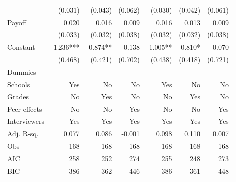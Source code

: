 \begin{table}[htbp]
\begin{adjustbox}{width=1\textwidth}
\begin{threeparttable}
\begin{tabular}{l*{6}{D{.}{.}{-1}}}
                    &             (0.031)   &             (0.043)   &             (0.062)   &             (0.030)   &             (0.042)   &             (0.061)   \\
Payoff              &               0.020   &               0.016   &               0.009   &               0.016   &               0.013   &               0.009   \\
                    &             (0.033)   &             (0.032)   &             (0.038)   &             (0.032)   &             (0.032)   &             (0.038)   \\
Constant            &              -1.236***&              -0.874** &               0.138   &              -1.005** &              -0.810*  &              -0.070   \\
                    &             (0.468)   &             (0.421)   &             (0.702)   &             (0.438)   &             (0.418)   &             (0.721)   \\ \midrule
Dummies &&&&&& \\
Schools             &                 Yes   &                  No   &                  No   &                 Yes   &                  No   &                  No   \\
Grades              &                  No   &                 Yes   &                  No   &                  No   &                 Yes   &                  No   \\
Peer effects        &                  No   &                  No   &                 Yes   &                  No   &                  No   &                 Yes   \\
Interviewers        &                 Yes   &                 Yes   &                 Yes   &                 Yes   &                 Yes   &                 Yes   \\
\midrule
Adj. R-sq.          &               0.077   &               0.086   &              -0.001   &               0.098   &               0.110   &               0.007   \\
Obs                 &                 168   &                 168   &                 168   &                 168   &                 168   &                 168   \\
AIC                 &                 258   &                 252   &                 274   &                 255   &                 248   &                 273   \\
BIC                 &                 386   &                 362   &                 446   &                 386   &                 361   &                 448   \\

\end{tabular}
\end{threeparttable}
\end{adjustbox}
\end{table}
